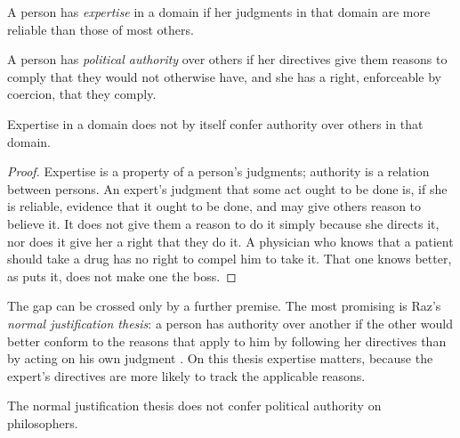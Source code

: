\documentclass{situationist-preprint}
\begin{document}
\begin{definition}\label{d:expertise}
A person has \emph{expertise} in a domain if her judgments in that domain are more reliable than those of most others.
\end{definition}

\begin{definition}\label{d:authority}
A person has \emph{political authority} over others if her directives give them reasons to comply that they would not otherwise have, and she has a right, enforceable by coercion, that they comply.
\end{definition}

\begin{proposition}\label{p:gap}
Expertise in a domain does not by itself confer authority over others in that domain.
\end{proposition}

\begin{proof}
Expertise is a property of a person's judgments; authority is a relation between persons. An expert's judgment that some act ought to be done is, if she is reliable, evidence that it ought to be done, and may give others reason to believe it. It does not give them a reason to do it simply because she directs it, nor does it give her a right that they do it. A physician who knows that a patient should take a drug has no right to compel him to take it. That one knows better, as \citet{Estlund2008} puts it, does not make one the boss.
\end{proof}

The gap can be crossed only by a further premise. The most promising is Raz's \emph{normal justification thesis}: a person has authority over another if the other would better conform to the reasons that apply to him by following her directives than by acting on his own judgment \citep{Raz1986}. On this thesis expertise matters, because the expert's directives are more likely to track the applicable reasons.

\begin{proposition}\label{p:closed}
The normal justification thesis does not confer political authority on philosophers.
\end{proposition}
\end{document}
